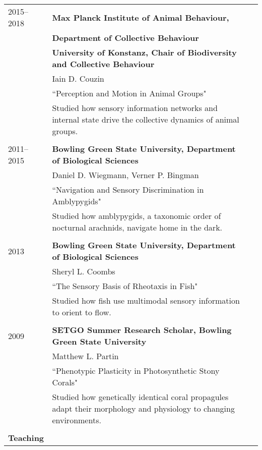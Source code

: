 \documentclass[letterpaper,10pt,oneside]{article}
\begin{document}
\begin{longtable}{@{} l p{5.3in}l}
 \large{2015–2018}
     & \textbf{Max Planck Institute of Animal Behaviour,}\\
     	& \textbf{Department of Collective Behaviour} \\
        & \textbf{University of Konstanz, Chair of Biodiversity and Collective Behaviour} \\
     & Iain D. Couzin \\
     & ``Perception and Motion in Animal Groups"  \vspace{1mm}\\
     & \parbox{5.0in}{Studied how sensory information networks and internal state drive the collective dynamics of animal groups.}\\
     & \\ 
 \large{2011–2015}
     & \textbf{Bowling Green State University, Department of Biological Sciences} \\
     & Daniel D. Wiegmann, Verner P. Bingman \\
     & ``Navigation and Sensory Discrimination in Amblypygids" \vspace{1mm}\\
     & \parbox{5.0in}{Studied how amblypygids, a taxonomic order of nocturnal arachnids, navigate home in the dark. }\\
     & \\
 \large{2013}
     & \textbf{Bowling Green State University, Department of Biological Sciences} \\
     & Sheryl L. Coombs \\
     & ``The Sensory Basis of Rheotaxis in Fish" \vspace{1mm}\\
     & \parbox{5.0in}{Studied how fish use multimodal sensory information to orient to flow.}\\
     & \\
 \large{2009}
     & \textbf{SETGO Summer Research Scholar, Bowling Green State University} \\
     & Matthew L. Partin \\
     & ``Phenotypic Plasticity in Photosynthetic Stony Corals" \vspace{1mm}\\
     & \parbox{5.0in}{Studied how genetically identical coral propagules adapt their morphology and physiology to changing environments.}\\
     & \\
\Large{\textbf{Teaching}}  \vspace{5mm} \\

\end{longtable}
\end{document}
